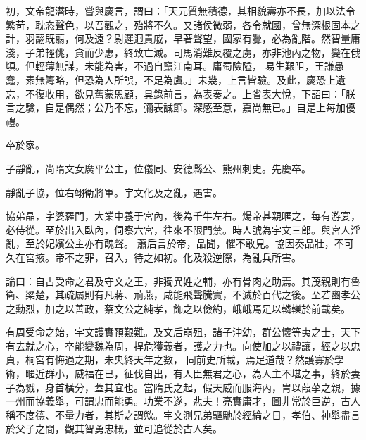 \begin{pinyinscope}
 初，文帝龍潛時，嘗與慶言，謂曰：「天元質無積德，其相貌壽亦不長，加以法令繁苛，耽恣聲色，以吾觀之，殆將不久。又諸侯微弱，各令就國，曾無深根固本之計，羽翮既翦，何及遠？尉遲迥貴戚，早著聲望，國家有釁，必為亂階。然智量庸淺，子弟輕佻，貪而少惠，終致亡滅。司馬消難反覆之虜，亦非池內之物，變在俄頃。但輕薄無謀，未能為害，不過自竄江南耳。庸蜀險隘，
 易生艱阻，王謙愚蠢，素無籌略，但恐為人所誤，不足為虞。」未幾，上言皆驗。及此，慶恐上遺忘，不復收用，欲見舊蒙恩顧，具錄前言，為表奏之。上省表大悅，下詔曰：「朕言之驗，自是偶然；公乃不忘，彌表誠節。深感至意，嘉尚無已。」自是上每加優禮。



 卒於家。



 子靜亂，尚隋文女廣平公主，位儀同、安德縣公、熊州刺史。先慶卒。



 靜亂子協，位右翊衛將軍。宇文化及之亂，遇害。



 協弟晶，字婆羅門，大業中養于宮內，後為千牛左右。煬帝甚親暱之，每有游宴，必侍從。至於出入臥內，伺察六宮，往來不限門禁。時人號為宇文三郎。與宮人淫亂，至於妃嬪公主亦有醜聲。
 蕭后言於帝，晶聞，懼不敢見。協因奏晶壯，不可久在宮掖。帝不之罪，召入，待之如初。化及殺逆際，為亂兵所害。



 論曰：自古受命之君及守文之王，非獨異姓之輔，亦有骨肉之助焉。其茂親則有魯衛、梁楚，其疏屬則有凡蔣、荊燕，咸能飛聲騰實，不滅於百代之後。至若豳孝公之勳烈，加之以善政，蔡文公之純孝，飾之以儉約，峨峨焉足以轔轢於前載矣。



 有周受命之始，宇文護實預艱難。及文后崩殂，諸子沖幼，群公懷等夷之士，天下有去就之心，卒能變魏為周，捍危獲義者，護之力也。向使加之以禮讓，經之以忠貞，桐宮有悔過之期，未央終天年之數，
 同前史所載，焉足道哉？然護寡於學術，暱近群小，威福在已，征伐自出，有人臣無君之心，為人主不堪之事，終於妻子為戮，身首橫分，蓋其宜也。當隋氏之起，假天威而服海內，胄以葭莩之親，據一州而協義舉，可謂忠而能勇。功業不遂，悲夫！亮實庸才，圖非常於巨逆，古人稱不度德、不量力者，其斯之謂歟。宇文測兄弟驅馳於經綸之日，孝伯、神舉盡言於父子之間，觀其智勇忠概，並可追從於古人矣。



\end{pinyinscope}